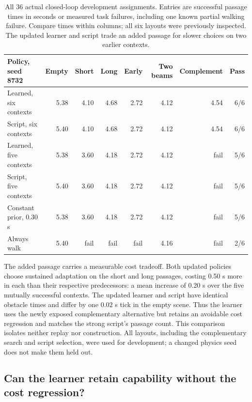 \documentclass[10pt]{article}
\begin{document}
\begin{table}[t]
\centering\small
\setlength{\tabcolsep}{4pt}
\begin{tabular}{lrrrrrrr}
\toprule
Policy, seed 8732 & Empty & Short & Long & Early & Two beams & Complement & Pass \\
\midrule
Learned, six contexts & 5.38 & 4.10 & 4.68 & 2.72 & 4.12 & 4.54 & 6/6 \\
Script, six contexts & 5.40 & 4.10 & 4.68 & 2.72 & 4.12 & 4.54 & 6/6 \\
Learned, five contexts & 5.38 & 3.60 & 4.18 & 2.72 & 4.12 & fail & 5/6 \\
Script, five contexts & 5.40 & 3.60 & 4.18 & 2.72 & 4.12 & fail & 5/6 \\
Constant prior, 0.30 s & 5.38 & 3.60 & 4.18 & 2.72 & 4.12 & fail & 5/6 \\
Always walk & 5.40 & fail & fail & fail & 4.16 & fail & 2/6 \\
\bottomrule
\end{tabular}
\caption{All 36 actual closed-loop development assignments. Entries are successful
passage times in seconds or measured task failures, including one known partial
walking failure. Compare times within columns; all six layouts were previously
inspected. The updated learner and script trade an added passage for slower
choices on two earlier contexts.}
\label{tab:policies}
\end{table}

The added passage carries a measurable cost tradeoff. Both updated policies
choose sustained adaptation on the short and long passages, costing 0.50 s more
in each than their respective predecessors: a mean increase of 0.20 s over the
five mutually successful contexts. The updated learner and script have identical
obstacle times and differ by one 0.02 s tick in the empty scene. Thus the learner
uses the newly exposed complementary alternative but retains an avoidable cost
regression and matches the strong script's passage count. This comparison isolates
neither replay nor construction. All layouts, including the complementary search
and script selection, were used for development; a changed physics seed does
not make them held out.

\subsection{Can the learner retain capability without the cost regression?}
\end{document}
